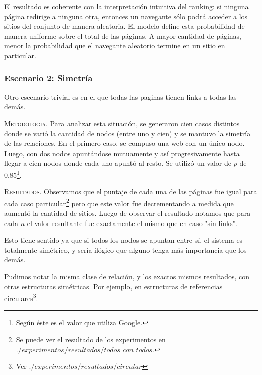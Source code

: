 \vspace{1em}
El resultado es coherente con la interpretación intuitiva del ranking: si ninguna página redirige a ninguna otra, entonces un navegante sólo podrá acceder a los sitios del conjunto de manera aleatoria. El modelo define esta probabilidad de manera uniforme sobre el total de las páginas. A mayor cantidad de páginas, menor la probabilidad que el navegante aleatorio termine en un sitio en particular.









\vspace{2em}
\subsubsection{Escenario 2: Simetría} Otro escenario trivial es en el que todas las paginas tienen links a todas las demás. 

\vspace{1em}

\vspace{1em}
\noindent \textsc{Metodología}. Para analizar esta situación, se generaron cien casos distintos donde se varió la cantidad de nodos (entre uno y cien) y se mantuvo la simetría de las relaciones. En el primero caso, se compuso una web con un único nodo. Luego, con dos nodos apuntándose mutuamente y así progresivamente hasta llegar a cien nodos donde cada uno apuntó al resto. Se utilizó un valor de $p$ de 0.85\footnote{Según \cite{Langville04} éste es el valor que utiliza Google.}.

\vspace{1em}
\noindent \textsc{Resultados}. Observamos que el puntaje de cada una de las páginas fue igual para cada caso particular\footnote{Se puede ver el resultado de los experimentos en $./experimentos/resultados/todos\_con\_todos$.} pero que este valor fue decrementando a medida que aumentó la cantidad de sitios. Luego de observar el resultado notamos que para cada $n$ el valor resultante fue exactamente el mismo que en caso "sin links".

Esto tiene sentido ya que si todos los nodos se apuntan entre sí, el sistema es totalmente simétrico, y sería ilógico que alguno tenga más importancia que los demás. 

\vspace{1em}
\noindent Pudimos notar la misma clase de relación, y los exactos mismos resultados, con otras estructuras simétricas. Por ejemplo, en estructuras de referencias circulares\footnote{Ver $./experimentos/resultados/circular$}.


